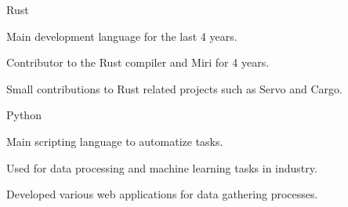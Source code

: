 


\begin{cvskills}


\cvskill
{Rust} %
{
    \begin{cvitems}
    \item Main development language for the last 4 years.
    \item Contributor to the Rust compiler and Miri for 4 years.
    \item Small contributions to Rust related projects such as Servo and Cargo.
    \end{cvitems}
}


\cvskill
{Python}
{
    \begin{cvitems}
    \item Main scripting language to automatize tasks.
    \item Used for data processing and machine learning tasks in industry.
    \item Developed various web applications for data gathering processes.
    \end{cvitems}
}
\vspace{-.5cm}
\vspace{-.5cm}

\end{cvskills}

